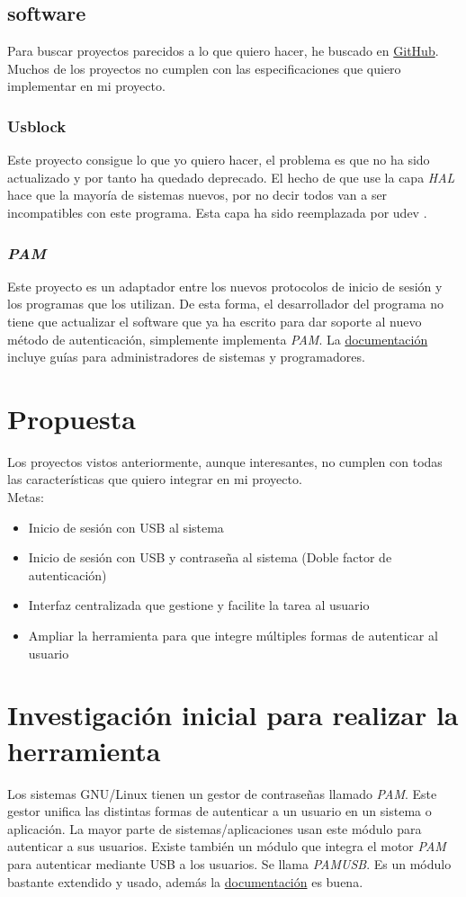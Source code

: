 \documentclass[titlepage]{article}
\begin{document}
\subsection{software}
Para buscar proyectos parecidos a lo que quiero hacer, he buscado en \href{https://github.com/}{GitHub}. Muchos de los proyectos no cumplen con las especificaciones que quiero implementar en mi proyecto. 
\subsubsection{Usblock \cite{usblock}}
Este proyecto consigue lo que yo quiero hacer, el problema es que no ha sido actualizado y por tanto ha quedado deprecado. El hecho de que use la capa \textit{\Gls{HAL}} hace que la mayoría de sistemas nuevos, por no decir todos van a ser incompatibles con este programa. Esta capa ha sido reemplazada por \Gls{udev} \cite{udev}.
\subsubsection{\textit{\Gls{PAM}}}
Este proyecto es un adaptador entre los nuevos protocolos de inicio de sesión y los programas que los utilizan. De esta forma, el desarrollador del programa no tiene que actualizar el software que ya ha escrito para dar soporte al nuevo método de autenticación, simplemente implementa \textit{\Gls{PAM}}. La \href{http://www.linux-pam.org/Linux-PAM-html/}{documentación} incluye guías para administradores de sistemas y programadores.
\section{Propuesta}
Los proyectos vistos anteriormente, aunque interesantes, no cumplen con todas las características que quiero integrar en mi proyecto.\\Metas:
\begin{itemize}
	\item Inicio de sesión con USB al sistema
	\item Inicio de sesión con USB y contraseña al sistema (Doble factor de autenticación)
	\item Interfaz centralizada que gestione y facilite la tarea al usuario
	\item Ampliar la herramienta para que integre múltiples formas de autenticar al usuario
\end{itemize}
\section{Investigación inicial para realizar la herramienta}
Los sistemas \Gls{GNU/Linux} tienen un gestor de contraseñas llamado \textit{\Gls{PAM}}. Este gestor unifica las distintas formas de autenticar a un usuario en un sistema o aplicación. La mayor parte de sistemas/aplicaciones usan este módulo para autenticar a sus usuarios. Existe también un módulo que integra el motor \textit{\Gls{PAM}} para autenticar mediante USB a los usuarios. Se llama \textit{\Gls{PAMUSB}}. Es un módulo bastante extendido y usado, además la \href{http://www.pamusb.org/#hotplug}{documentación} es buena.
\end{document}
